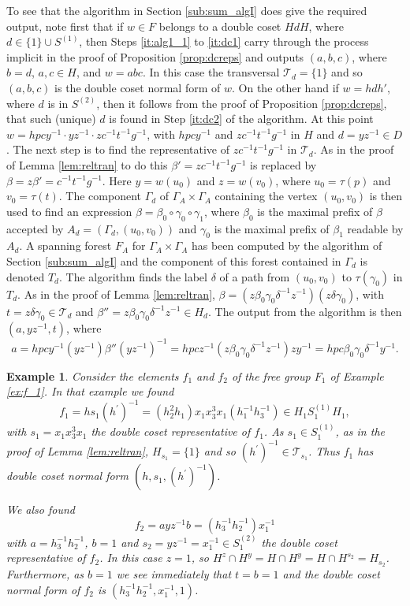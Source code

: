 \documentclass[a4paper,12pt]{article}
\renewcommand{\b}{\beta }
\newcommand{\G}{\Gamma }
\newcommand{\g}{\gamma }
\renewcommand{\d}{\delta }
\renewcommand{\t}{\tau }
\newtheorem{exam}[theorem]{Example}
\newenvironment{example}{\begin{exam} \rm}{\end{exam}}
\numberwithin{equation}{section}
\numberwithin{figure}{section}
\newcommand{\cT}{\mathcal{T}}
\begin{document}
To see that the algorithm in Section \ref{sub:sum_algI} does give the 
required output, note first that if $w\in F$ belongs to a double
coset $HdH$, where $d\in \{1\}\cup S^{(1)}$, then Steps \ref{it:alg1_1} to
\ref{it:dc1} carry through the process implicit in the proof of 
Proposition \ref{prop:dcreps} and outputs $(a,b,c)$, where $b=d$, $a,c\in H$,
and $w=abc$. In this case the transversal $\cT_d=\{1\}$ and so 
$(a,b,c)$ is the double coset normal form of $w$. On the other hand
if $w=hdh'$, where $d$ is in $S^{(2)}$, then it follows from the 
proof of Proposition \ref{prop:dcreps}, that such (unique) 
$d$ is found in Step \ref{it:dc2}
of the algorithm. At this point 
$w=hpcy^{-1}\cdot yz^{-1}\cdot zc^{-1}t^{-1}g^{-1}$, with
 $hpcy^{-1}$ and $zc^{-1}t^{-1}g^{-1}$ in $H$ and $d=yz^{-1}\in D$. 
The next step is to find the representative of $zc^{-1}t^{-1}g^{-1}$ 
in $\cT_d$. As in the proof of Lemma \ref{lem:reltran} to do this
$\b'=zc^{-1}t^{-1}g^{-1}$  is replaced by $\b=z\b'= c^{-1}t^{-1}g^{-1}$.
Here $y=w(u_0)$ and $z=w(v_0)$, where $u_0=\t(p)$ and $v_0=\t(t)$.  
The component $\G_d$ of $\G_A\times \G_A$ 
containing the vertex $(u_0,v_0)$ is then
used to find an expression $\b=\b_0\circ \g_0\circ \g_1$, where $\b_0$
is the maximal prefix of $\b$ accepted by $A_d=(\G_d,(u_0,v_0))$ and $\g_0$ is
the maximal prefix of $\b_1$ readable by $A_d$. A spanning forest
$F_A$ for $\G_A\times \G_A$ has been computed by the algorithm of 
Section \ref{sub:sum_algI} and the component of this forest contained
in $\G_d$ is denoted $T_d$. The algorithm finds the label $\d$ of a path
from $(u_0,v_0)$ to $\t(\g_0)$ in $T_d$. As in the proof of Lemma 
\ref{lem:reltran}, $\b=(z\b_0\g_0\d^{-1}z^{-1})(z\d\g_0)$, with
$t=z\d\g_0\in \cT_d$ and $\b''=z\b_0\g_0\d^{-1}z^{-1}\in H_d$. The output
from the algorithm is then $(a,yz^{-1},t)$, where 
\[a=hpcy^{-1}(yz^{-1})\b''(yz^{-1})^{-1}
=hpcz^{-1}(z\b_0\g_0\d^{-1}z^{-1})zy^{-1} =hpc\b_0\g_0\d^{-1}y^{-1}.\]

\begin{example}\label{ex:f_1_again}
Consider the elements 
$f_1$ and $f_2$ of the free group $F_1$ of Example \ref{ex:f_1}. 
In that example we found  
\[f_1=hs_1(h^\prime)^{-1}=(h_2^{2}h_1) x_1x_3^3x_1(h_1^{-1}h_3^{-1})\in H_1S_1^{(1)}H_1,\]
with $s_1=x_1x_3^3x_1$ the double coset representative of $f_1$. 
As $s_1\in S_1^{(1)}$, as in the proof of Lemma \ref{lem:reltran}, 
$H_{s_1}=\{1\}$ and so $(h^\prime)^{-1}\in \cT_{s_1}$. Thus
$f_1$ has double coset normal form $(h, s_1, (h^\prime)^{-1})$.

We also found 
\[f_2=a yz^{-1} b=(h_3^{-1}h_2^{-1}) x_1^{-1}\]
with $a=h_3^{-1}h_2^{-1}$, $b=1$ and $s_2=yz^{-1}= x_1^{-1}\in S_1^{(2)}$ 
 the double coset representative of $f_2$. 
In this case $z=1$, so $H^z\cap H^y=H\cap H^y=H\cap H^{s_2}=H_{s_2}$. 
Furthermore, as $b=1$ we see immediately that $t=b=1$ and the
double coset normal form of $f_2$ is $(h_3^{-1}h_2^{-1}, x_1^{-1}, 1)$.
\end{example}
\end{document}
